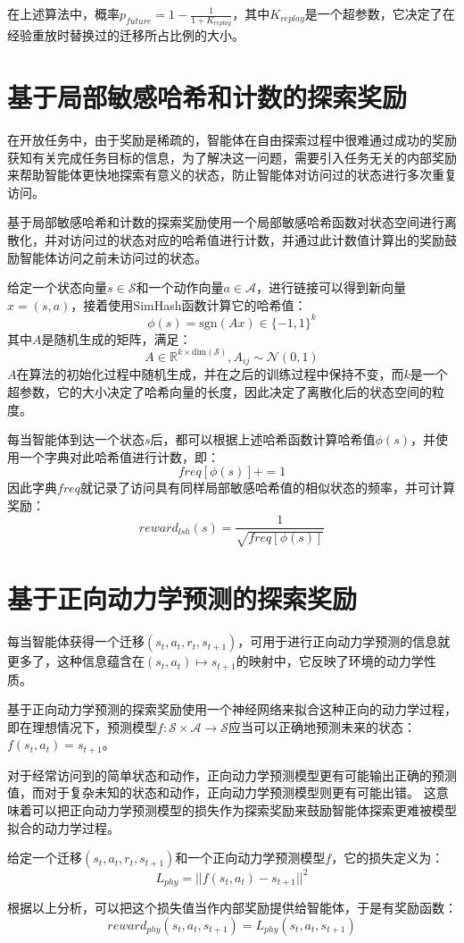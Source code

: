     在上述算法中，概率$p_{future}=1-\frac{1}{1+K_{replay}}$，其中$K_{replay}$是一个超参数，它决定了在经验重放时替换过的迁移所占比例的大小。

    \section{基于局部敏感哈希和计数的探索奖励}\label{LSHsec}
    在开放任务中，由于奖励是稀疏的，智能体在自由探索过程中很难通过成功的奖励获知有关完成任务目标的信息，为了解决这一问题，需要引入任务无关的内部奖励来帮助智能体更快地探索有意义的状态，防止智能体对访问过的状态进行多次重复访问。

    基于局部敏感哈希和计数的探索奖励\cite{DBLP:journals/corr/TangHFSCDSTA16,671516,conf/stoc/Charikar02}使用一个局部敏感哈希函数对状态空间进行离散化，并对访问过的状态对应的哈希值进行计数，并通过此计数值计算出的奖励鼓励智能体访问之前未访问过的状态。

    给定一个状态向量$s\in \mathcal S$和一个动作向量$a\in \mathcal A$，进行链接可以得到新向量$x=(s,a)$，接着使用SimHash函数计算它的哈希值：
    $$\phi(s)=\mathrm{sgn}(A x)\in\{-1,1\}^k$$
    其中$A$是随机生成的矩阵，满足：
    $$A\in \mathbb R^{k\times \mathrm{dim}(\mathcal S)}, A_{ij}\sim \mathcal N(0,1)$$ 
    $A$在算法的初始化过程中随机生成，并在之后的训练过程中保持不变，而$k$是一个超参数，它的大小决定了哈希向量的长度，因此决定了离散化后的状态空间的粒度。

    每当智能体到达一个状态$s$后，都可以根据上述哈希函数计算哈希值$\phi(s)$，并使用一个字典对此哈希值进行计数，即：
    $$freq[\phi(s)] += 1$$
    因此字典$freq$就记录了访问具有同样局部敏感哈希值的相似状态的频率，并可计算奖励：
    $$ reward_{lsh}(s)=\frac{1}{\sqrt{freq[\phi(s)]}}$$ 


    \section{基于正向动力学预测的探索奖励}
    每当智能体获得一个迁移$(s_t, a_t, r_t, s_{t+1})$，可用于进行正向动力学预测的信息就更多了，这种信息蕴含在$(s_t,a_t)\mapsto s_{t+1}$的映射中，它反映了环境的动力学性质。
    
    基于正向动力学预测的探索奖励\cite{DBLP:journals/corr/StadieLA15}使用一个神经网络来拟合这种正向的动力学过程，即在理想情况下，预测模型$f:\mathcal S\times \mathcal A\to \mathcal S$应当可以正确地预测未来的状态：$f(s_t, a_t) = s_{t+1}$。

    对于经常访问到的简单状态和动作，正向动力学预测模型更有可能输出正确的预测值，而对于复杂未知的状态和动作，正向动力学预测模型则更有可能出错。
    这意味着可以把正向动力学预测模型的损失作为探索奖励来鼓励智能体探索更难被模型拟合的动力学过程。

    给定一个迁移$(s_t, a_t, r_t, s_{t+1})$和一个正向动力学预测模型$f$，它的损失定义为：
    $$ L_{phy} = ||f(s_t, a_t) - s_{t+1}||^2$$ 

    根据以上分析，可以把这个损失值当作内部奖励提供给智能体，于是有奖励函数：
    $$ reward_{phy}(s_t, a_t, s_{t+1}) =  L_{phy}(s_t, a_t, s_{t+1}) $$ 
